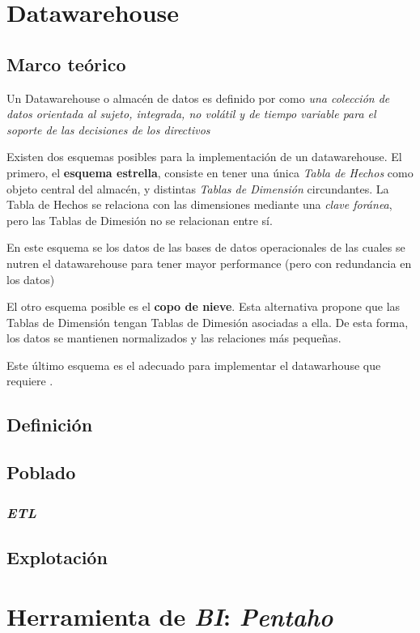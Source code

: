 \section{Datawarehouse}

\subsection{Marco teórico}

Un Datawarehouse o almacén de datos es definido por \autocite{elmasri-dw} como \emph{una colección de datos orientada al sujeto, integrada, no volátil y de tiempo variable para el soporte de las decisiones de los directivos} 

Existen dos esquemas posibles para la implementación de un datawarehouse. El primero, el \textbf{esquema estrella}, consiste en tener una única \emph{Tabla de Hechos} como objeto central del almacén, y distintas \emph{Tablas de Dimensión} circundantes. La Tabla de Hechos se relaciona con las dimensiones mediante una \emph{clave foránea}, pero las Tablas de Dimesión no se relacionan entre sí.

En este esquema se  los datos de las bases de datos operacionales de las cuales se nutren el datawarehouse para tener mayor performance (pero con redundancia en los datos)

El otro esquema posible es el \textbf{copo de nieve}. Esta alternativa propone que las Tablas de Dimensión tengan Tablas de Dimesión asociadas a ella. De esta forma, los datos se mantienen normalizados y las relaciones más pequeñas.

Este último esquema es el adecuado para implementar el datawarhouse que requiere .

\subsection{Definición}

\subsection{Poblado}

\subsubsection{\emph{ETL}}


\subsection{Explotación}


\section{Herramienta de \emph{BI}: \emph{Pentaho}}






\clearpage
\printbibliography



